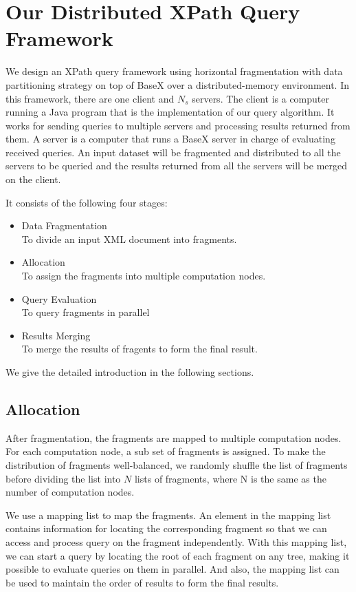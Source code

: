 \section{Our Distributed XPath Query Framework}

We design an XPath query framework using horizontal fragmentation with data
partitioning strategy on top of BaseX over a distributed-memory environment. 
In this framework, there are one client and $N_s$ servers. The client is a
computer running a Java program that is the implementation of our query
algorithm. It works for sending queries to multiple servers and processing
results returned from them. A server is a computer that runs a BaseX server in
charge of evaluating received queries. An input dataset will be fragmented and
distributed to all the servers to be queried and the results returned from all
the servers will be merged on the client.

It consists of the following four stages:\\
\begin{itemize}
	\item Data Fragmentation \\To divide an input XML document into fragments.
	\item Allocation\\ To assign the fragments into multiple computation nodes.
	\item Query Evaluation\\ To query fragments in parallel
	\item Results Merging\\ To merge the results of fragents to form the final result.
\end{itemize}

We give the detailed introduction in the following sections.

\subsection{Allocation}

After fragmentation, the fragments are mapped to multiple computation nodes. For each
computation node, a sub set of fragments is assigned. To make the distribution
of fragments well-balanced, we randomly shuffle the list of fragments before
dividing the list into $N$ lists of fragments, where N is the same as the number
of computation nodes. 

We use a mapping list to map the fragments. An element in the mapping list
contains information for locating the corresponding fragment so that we can
access and process query on the fragment independently.  With this mapping list,
we can start a query by locating the root of each fragment on any tree, making
it possible to evaluate queries on them in parallel.  And also, the mapping list
can be used to maintain the order of results to form the final results.

